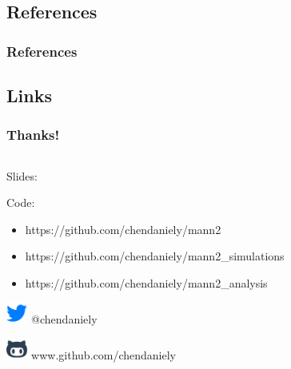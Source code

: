 \documentclass[compress]{beamer}
\begin{document}
\subsection{References}
    \begin{frame}
            \frametitle{References}
            \nocite{*}
            \tiny
            
            
    \end{frame}

\subsection{Links}
    \begin{frame}[Basic2] \frametitle{Thanks!}
       \begin{columns}
           \begin{column}{0.5\textwidth}
                \tiny
                
                Slides:
                
                Code:
                \begin{itemize}
                   \item https://github.com/chendaniely/mann2
                   \item https://github.com/chendaniely/mann2\_simulations
                   \item https://github.com/chendaniely/mann2\_analysis
                \end{itemize}
                
                \includegraphics[width=7mm]{../figures/font-awesome_4-6-3_twitter_256_0_007dff_none}
                @chendaniely
                
                \includegraphics[width=7mm]{../figures/brandico_2014-04-07_github_256_0_2c3e50_none}
                www.github.com/chendaniely
            \end{column}
            \begin{column}{0.5\textwidth}
                \vspace{10mm}


\end{column}
\end{columns}
\end{frame}
\end{document}
